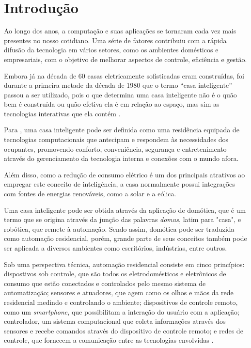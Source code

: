 \chapter{Introdução}

\label{cap:1}

Ao longo dos anos, a computação e suas aplicações se tornaram cada vez mais presentes no nosso cotidiano. Uma
série de fatores contribuiu com a rápida difusão da tecnologia em vários setores, como os ambientes domésticos
e empresariais, com o objetivo de melhorar aspectos de controle, eficiência e gestão.

Embora já na década de 60 casas eletricamente sofisticadas eram construídas, foi durante a primeira metade da
década de 1980 que o termo  ``casa inteligente'' passou a ser utilizado, pois o que determina uma casa
inteligente não é o quão bem é construída ou quão efetiva ela é em relação ao espaço, mas sim as tecnologias
interativas que ela contém \cite{harper2003}.

Para , uma casa inteligente pode ser definida como uma residência equipada de
tecnologias computacionais que antecipam e respondem às necessidades dos ocupantes, promovendo conforto,
conveniência, segurança e entretenimento através do gerenciamento da tecnologia interna e conexões com o mundo
afora.

Além disso, como a redução de consumo elétrico é um dos principais atrativos ao empregar este conceito de
inteligência, a casa normalmente possui integrações com fontes de energias renováveis, como a solar e a
eólica.

Uma casa inteligente pode ser obtida através da aplicação de domótica, que é um termo que se origina através
da junção das palavras \textit{domus}, latim para "casa", e robótica, que remete à automação. Sendo assim,
domótica pode ser traduzida como automação residencial, porém, grande parte de seus conceitos também pode ser
aplicada a diversos ambientes como escritórios, indústrias, entre outros.

Sob uma perspectiva técnica, automação residencial consiste em cinco princípios: dispostivos sob controle, que
são todos os eletrodomésticos e eletrônicos de consumo que estão conectados e controlados pelo mesmo sistema
de automatização; sensores e atuadores, que agem como os olhos e mãos da rede residencial medindo e
controlando o ambiente; dispositivos de controle remoto, como um \textit{smartphone}, que possibilitam a
interação do usuário com a aplicação; controlador, um sistema computacional que coleta informações através dos
sensores e recebe comandos através do dispositivo de controle remoto; e redes de controle, que fornecem a
comunicação entre as tecnologias envolvidas \cite{kyas2013}.

